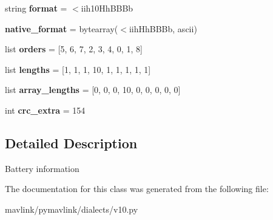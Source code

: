 \begin{DoxyCompactItemize}
\item 
\mbox{\label{classpymavlink_1_1dialects_1_1v10_1_1MAVLink__battery__status__message_a2353ca70a82deefe4a9ab59ee3c7ae7e}} 
string {\bfseries format} = \textquotesingle{}$<$iih10\+Hh\+B\+B\+Bb\textquotesingle{}
\item 
\mbox{\label{classpymavlink_1_1dialects_1_1v10_1_1MAVLink__battery__status__message_ac0fef726e0df38d14d2d6ba8bf089c62}} 
{\bfseries native\+\_\+format} = bytearray(\textquotesingle{}$<$iih\+Hh\+B\+B\+Bb\textquotesingle{}, \textquotesingle{}ascii\textquotesingle{})
\item 
\mbox{\label{classpymavlink_1_1dialects_1_1v10_1_1MAVLink__battery__status__message_ad2494810b21d33e384112a831b9e20ca}} 
list {\bfseries orders} = \mbox{[}5, 6, 7, 2, 3, 4, 0, 1, 8\mbox{]}
\item 
\mbox{\label{classpymavlink_1_1dialects_1_1v10_1_1MAVLink__battery__status__message_a46512afecf130b53738817d67fb268de}} 
list {\bfseries lengths} = \mbox{[}1, 1, 1, 10, 1, 1, 1, 1, 1\mbox{]}
\item 
\mbox{\label{classpymavlink_1_1dialects_1_1v10_1_1MAVLink__battery__status__message_af991a427fa2238046648b3c6ca68ab06}} 
list {\bfseries array\+\_\+lengths} = \mbox{[}0, 0, 0, 10, 0, 0, 0, 0, 0\mbox{]}
\item 
\mbox{\label{classpymavlink_1_1dialects_1_1v10_1_1MAVLink__battery__status__message_ae5c9debbe4b9614881045716857837c9}} 
int {\bfseries crc\+\_\+extra} = 154
\end{DoxyCompactItemize}


\subsection{Detailed Description}
\begin{DoxyVerb}Battery information
\end{DoxyVerb}
 

The documentation for this class was generated from the following file\+:\begin{DoxyCompactItemize}
\item 
mavlink/pymavlink/dialects/v10.\+py\end{DoxyCompactItemize}
